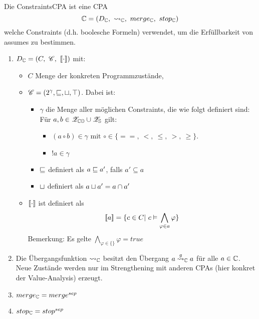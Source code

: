 Die ConstraintsCPA ist eine CPA \[\constraints = (D_\constraints,\ \transfer_\constraints,\ merge_\constraints,\ stop_\constraints)\] welche Constraints (d.h. boolesche Formeln) verwendet, um die Erf\"ullbarkeit von assumes zu bestimmen. 
\begin{enumerate}
  \item $D_\constraints = (C,\ \constraintlattice,\ \concretization)$ mit:
    \begin{itemize}
      \item $C$ Menge der konkreten Programmzust\"ande,

      \item $\mathscr{C} = (2^\gamma, \sqsubseteq, \sqcup, \top)$. Dabei ist:
        \begin{itemize}
          \item $\gamma$ die Menge aller m\"oglichen Constraints, die wie folgt definiert sind: 
              F\"ur $a, b \in \mathscr{Z}_{\mathbb{CO}} \cup \mathscr{Z}_{\mathbb{S}}$ gilt:
              \begin{itemize}
                \item $(a \circ b) \in \gamma \text{ mit } \circ \in \{ ==,\ <,\ \leq ,\ >,\ \geq \}$.
                \item $!a \in \gamma$
              \end{itemize}
          \item $\sqsubseteq$ definiert als $a \sqsubseteq a'$, falls $a' \subseteq a$
          \item $\sqcup$ definiert als $a \sqcup a' = a \cap a'$
        \end{itemize} 

      \item $[\![ \cdot ]\!]$ ist definiert als 
        \[ \llbracket a \rrbracket = \{ c \in C |\ c \satisfies \displaystyle\bigwedge_{\varphi \in a} \varphi \} \]
        Bemerkung: Es gelte $\displaystyle\bigwedge_{\varphi \in \{\}} \varphi = true$
    \end{itemize}

  \item Die \"Ubergangsfunktion $\rightsquigarrow_{\mathbb{C}}$ besitzt den \"Ubergang $a \overset{g}{\rightsquigarrow}_{\mathbb{C}} a$ f\"ur alle $a \in \mathbb{C}$.
        Neue Zust\"ande werden nur im Strengthening mit anderen CPAs (hier konkret der Value-Analysis) erzeugt.

  \item $merge_{\mathbb{C}} = merge^{sep}$
  \item $stop_{\mathbb{C}} = stop^{sep}$
\end{enumerate}

